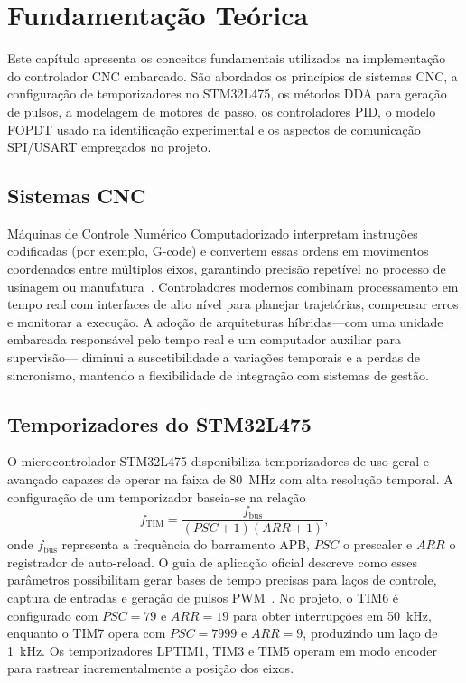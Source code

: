 \chapter{Fundamentação Teórica}\label{cap:fundamentacao}

Este capítulo apresenta os conceitos fundamentais utilizados na
implementação do controlador CNC embarcado. São abordados os princípios
de sistemas CNC, a configuração de temporizadores no STM32L475, os
métodos DDA para geração de pulsos, a modelagem de motores de passo,
os controladores PID, o modelo FOPDT usado na identificação experimental
e os aspectos de comunicação SPI/USART empregados no projeto.

\section{Sistemas CNC}

Máquinas de Controle Numérico Computadorizado interpretam instruções
codificadas (por exemplo, G-code) e convertem essas ordens em movimentos
coordenados entre múltiplos eixos, garantindo precisão repetível no
processo de usinagem ou manufatura~\cite{groover2015}. Controladores
modernos combinam processamento em tempo real com interfaces de alto
nível para planejar trajetórias, compensar erros e monitorar a execução.
A adoção de arquiteturas híbridas---com uma unidade embarcada
responsável pelo tempo real e um computador auxiliar para supervisão---
diminui a suscetibilidade a variações temporais e a perdas de
sincronismo, mantendo a flexibilidade de integração com sistemas de
gestão.

\section{Temporizadores do STM32L475}

O microcontrolador STM32L475 disponibiliza temporizadores de uso geral e
avançado capazes de operar na faixa de \SI{80}{\mega\hertz} com alta
resolução temporal. A configuração de um temporizador baseia-se na
relação
\begin{equation}
    f_{\text{TIM}} = \frac{f_{\text{bus}}}{(PSC+1)(ARR+1)},
\end{equation}
onde $f_{\text{bus}}$ representa a frequência do barramento APB, $PSC$ o
prescaler e $ARR$ o registrador de auto-reload. O guia de aplicação
oficial descreve como esses parâmetros possibilitam gerar bases de tempo
precisas para laços de controle, captura de entradas e geração de pulsos
PWM~\cite{st_an4013}. No projeto, o TIM6 é configurado com
$PSC = 79$ e $ARR = 19$ para obter interrupções em \SI{50}{\kilo\hertz},
enquanto o TIM7 opera com $PSC = 7999$ e $ARR = 9$, produzindo um laço
de \SI{1}{\kilo\hertz}. Os temporizadores LPTIM1, TIM3 e TIM5 operam em
modo encoder para rastrear incrementalmente a posição dos eixos.

